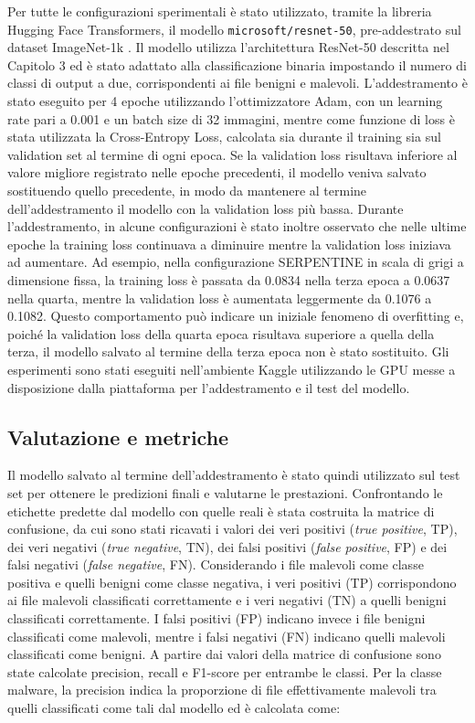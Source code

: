 Per tutte le configurazioni sperimentali è stato utilizzato, tramite
la libreria Hugging Face Transformers, il modello
\texttt{microsoft/resnet-50}, pre-addestrato sul dataset ImageNet-1k
\cite{huggingface_resnet50}. Il modello utilizza l'architettura
ResNet-50 descritta nel Capitolo 3 ed è stato adattato alla classificazione binaria
impostando il numero di classi di output a due, corrispondenti
ai file benigni e malevoli.
L'addestramento è stato eseguito per 4 epoche utilizzando
l'ottimizzatore Adam, con un learning rate pari a 0.001 e un batch
size di 32 immagini, mentre come funzione di loss è stata utilizzata
la Cross-Entropy Loss, calcolata sia durante il training sia sul
validation set al termine di ogni epoca. Se la validation loss
risultava inferiore al valore migliore registrato nelle epoche
precedenti, il modello veniva salvato sostituendo quello precedente,
in modo da mantenere al termine dell'addestramento il modello con la
validation loss più bassa.
Durante l'addestramento, in alcune configurazioni è stato inoltre
osservato che nelle ultime epoche la training loss continuava a
diminuire mentre la validation loss iniziava ad aumentare. Ad esempio,
nella configurazione SERPENTINE in scala di grigi a dimensione fissa,
la training loss è passata da 0.0834 nella terza epoca a 0.0637 nella
quarta, mentre la validation loss è aumentata leggermente da 0.1076
a 0.1082. Questo comportamento può indicare un iniziale fenomeno di
overfitting e, poiché la validation loss della quarta epoca risultava
superiore a quella della terza, il modello salvato al termine della
terza epoca non è stato sostituito.
Gli esperimenti sono stati eseguiti nell'ambiente Kaggle utilizzando
le GPU messe a disposizione dalla piattaforma per l'addestramento e
il test del modello.

\subsection{Valutazione e metriche}

Il modello salvato al termine dell'addestramento è stato quindi
utilizzato sul test set per ottenere le predizioni finali e valutarne
le prestazioni. Confrontando le etichette predette dal modello con
quelle reali è stata costruita la matrice di confusione, da cui sono
stati ricavati i valori dei veri positivi (\textit{true positive},
TP), dei veri negativi (\textit{true negative}, TN), dei falsi
positivi (\textit{false positive}, FP) e dei falsi negativi
(\textit{false negative}, FN).
Considerando i file malevoli come classe positiva e quelli benigni
come classe negativa, i veri positivi (TP) corrispondono ai file
malevoli classificati correttamente e i veri negativi (TN) a quelli
benigni classificati correttamente. I falsi positivi (FP) indicano
invece i file benigni classificati come malevoli, mentre i falsi
negativi (FN) indicano quelli malevoli classificati come benigni.
A partire dai valori della matrice di confusione sono state calcolate
precision, recall e F1-score per entrambe le classi.
Per la classe malware, la precision indica la proporzione di file
effettivamente malevoli tra quelli classificati come tali dal modello
ed è calcolata come:

